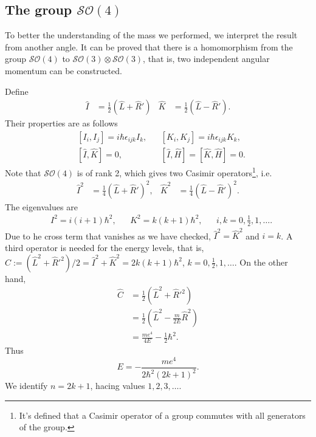 \documentclass[a4paper,11pt]{article}
\theoremstyle{remark}
\theoremstyle{defn}
\begin{document}
\subsection{The group $\mathcal{SO}(4)$}
To better the understanding of the mass we performed, we interpret the result from another angle. It can be proved that there is a
homomorphism from the group $\mathcal{SO}(4)$ to $\mathcal{SO}(3)\otimes\mathcal{SO}(3)$, that is, two independent angular momentum
can be constructed.\par
Define
\begin{align}
\hat{I} &= \frac{1}{2}(\hat{L}+\hat{R}') & \hat{K} &=  \frac{1}{2}(\hat{L}-\hat{R}').
\end{align}
Their properties are as follows
\begin{align}
&[I_i,I_j] = i\hbar \epsilon_{ijk}I_k, & &[K_i,K_j] = i\hbar \epsilon_{ijk}K_k,\\
&[\hat{I},\hat{K}] = 0, & &[\hat{I},\hat{H}] = [\hat{K},\hat{H}] = 0.
\end{align}
Note that $\mathcal{SO}(4)$ is of rank 2, which gives two Casimir operators\footnote{It's defined that a Casimir operator of a group 
commutes with all generators of the group.}, i.e.
\begin{align}
\hat{I}^2 &= \frac{1}{4}(\hat{L}+\hat{R}')^2, & \hat{K}^2 &= \frac{1}{4}(\hat{L}-\hat{R}')^2.
\end{align}
The eigenvalues are
\begin{align}
&I^2 = i(i+1)\hbar^2, & &K^2 = k(k+1)\hbar^2, & &i,k=0,\frac{1}{2},1,\ldots.
\end{align}
Due to he cross term that vanishes as we have checked, $\hat{I}^2=\hat{K}^2$ and $i=k$.
A third operator is needed for the energy levels, that is, $\hat{C}:=(\hat{L}^2+\hat{R}'^2)/2 = \hat{I}^2+\hat{K}^2 = 2k(k+1)\hbar^2$,
$k=0,\frac{1}{2},1,\ldots$. On the other hand, 
\begin{equation}
\begin{split}
\hat{C} &= \frac{1}{2}(\hat{L}^2+\hat{R}'^2)\\
&= \frac{1}{2}(\hat{L}^2-\frac{m}{2E}\hat{R}^2)\\
&= \frac{me^4}{4E}-\frac{1}{2}\hbar^2.
\end{split}
\end{equation}
Thus 
\begin{equation}
E=-\frac{me^4}{2\hbar^2(2k+1)^2}.\label{eq:ele}
\end{equation}
We identify $n=2k+1$, hacing values $1,2,3,\ldots$. 
\par 
\end{document}
